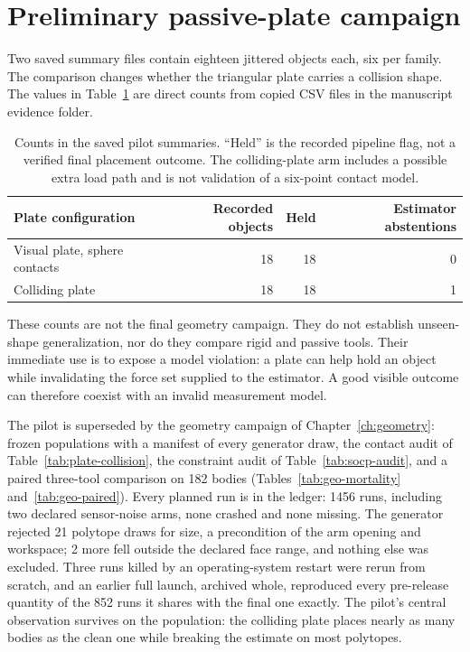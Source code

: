 \section{Preliminary passive-plate campaign}

Two saved summary files contain eighteen jittered objects each, six per family. The comparison changes whether the triangular plate carries a collision shape. The values in Table~\ref{tab:plate-pilot} are direct counts from copied CSV files in the manuscript evidence folder.

\begin{table}[htbp]\centering\small
\begin{tabular}{@{}lrrr@{}}\toprule
Plate configuration & Recorded objects & Held & Estimator abstentions\\
\midrule
Visual plate, sphere contacts & 18 & 18 & 0\\
Colliding plate & 18 & 18 & 1\\
\bottomrule\end{tabular}
\caption{Counts in the saved pilot summaries. ``Held'' is the recorded pipeline flag, not a verified final placement outcome. The colliding-plate arm includes a possible extra load path and is not validation of a six-point contact model.}
\label{tab:plate-pilot}
\end{table}

These counts are not the final geometry campaign. They do not establish unseen-shape generalization, nor do they compare rigid and passive tools. Their immediate use is to expose a model violation: a plate can help hold an object while invalidating the force set supplied to the estimator. A good visible outcome can therefore coexist with an invalid measurement model.

The pilot is superseded by the geometry campaign of Chapter~\ref{ch:geometry}: frozen populations with a manifest of every generator draw, the contact audit of Table~\ref{tab:plate-collision}, the constraint audit of Table~\ref{tab:socp-audit}, and a paired three-tool comparison on 182 bodies (Tables~\ref{tab:geo-mortality} and~\ref{tab:geo-paired}). Every planned run is in the ledger: 1456 runs, including two declared sensor-noise arms, none crashed and none missing. The generator rejected 21 polytope draws for size, a precondition of the arm opening and workspace; 2 more fell outside the declared face range, and nothing else was excluded. Three runs killed by an operating-system restart were rerun from scratch, and an earlier full launch, archived whole, reproduced every pre-release quantity of the 852 runs it shares with the final one exactly. The pilot's central observation survives on the population: the colliding plate places nearly as many bodies as the clean one while breaking the estimate on most polytopes.

